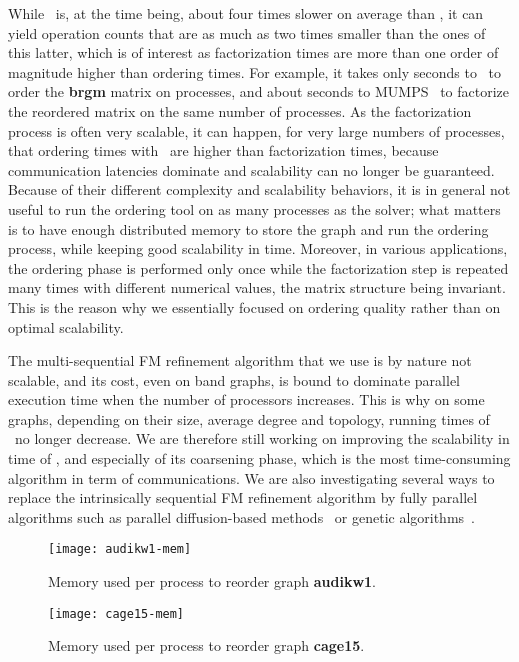 \documentclass[fleqn,12pt,twoside]{article}
\begin{document}
While \ptscotch\ is, at the time being, about four times slower on
average than \parmetis, it can yield operation counts that are as much
as two times smaller than the ones of this latter, which is of interest
as factorization times are more than one order of magnitude higher
than ordering times. For example, it takes only  seconds to
\ptscotch\ to order the \textbf{brgm} matrix on  processes, and
about  seconds to {\sc MUMPS}~\cite{amdule00} to factorize the
reordered matrix on the same number of processes.
As the factorization process is often very scalable, it can
happen, for very large numbers of processes, that ordering times with
\ptscotch\ are higher than factorization times, because
communication latencies dominate and scalability can no longer be
guaranteed. Because of their different complexity and scalability
behaviors, it is in general not useful to run the ordering tool on as
many processes as the solver; what matters is to have enough
distributed memory to store the graph and run the ordering process,
while keeping good scalability in time.
Moreover, in various applications, the ordering phase is performed
only once while the factorization step is repeated many times with
different numerical values, the matrix structure being invariant. This
is the reason why we essentially focused on ordering quality rather
than on optimal scalability.

The multi-sequential FM refinement algorithm that we use is by nature
not scalable, and its cost, even on band graphs, is bound to dominate
parallel execution time when the number of processors increases. This
is why on some graphs, depending on their size, average degree and
topology, running times of \ptscotch\ no longer decrease. We are
therefore still working on improving the scalability in time of
\ptscotch, and especially of its coarsening phase, which is the most
time-consuming algorithm in term of communications. We are also
investigating several ways to replace the intrinsically sequential FM
refinement algorithm by fully parallel algorithms such as parallel
diffusion-based methods~\cite{pell07b} or genetic
algorithms~\cite{chpe06a}.

\begin{figure}[htb]
\begin{minipage}[t]{0.47\textwidth}
\texttt{[image: audikw1-mem]}
\vspace*{-3.5em}
\caption{Memory used per process to reorder graph \textbf{audikw1}.}
\label{fig:audikw1-mem}
\end{minipage}\hspace{\fill}\begin{minipage}[t]{0.47\textwidth}
\texttt{[image: cage15-mem]}
\vspace*{-3.5em}
\caption{Memory used per process to reorder graph \textbf{cage15}.}
\label{fig:cage15-mem}
\end{minipage}
\end{figure}
\end{document}
